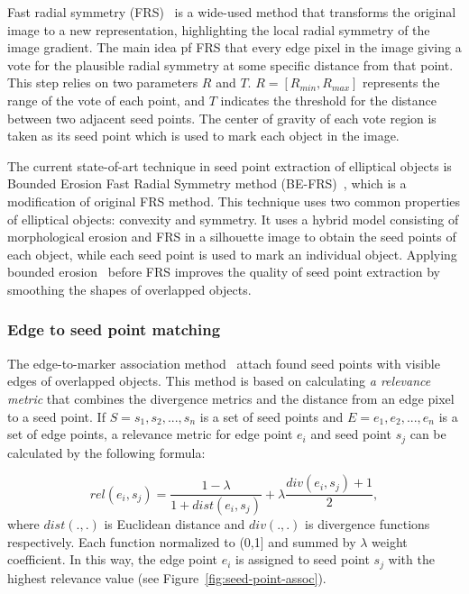 \documentclass{lutmscthesis}[2010/09/22]
\begin{document}
Fast radial symmetry (FRS)~\cite{FRS}  is a wide-used method that transforms the original
image to a new representation, highlighting the local radial symmetry of the image gradient.
The main idea pf FRS that  every edge pixel in the image giving a vote for the plausible radial symmetry at some specific distance from that point. This step relies on two parameters $R$ and $T$. $R = [R_{min} , R_{max}]$ represents the range of the vote of each point, and $T$ indicates the threshold for the distance between two adjacent seed points. The center
of gravity of each vote region is taken as its seed point which is used to mark
each object in the image. 

The current state-of-art technique in seed point extraction of elliptical objects is Bounded Erosion Fast
Radial Symmetry method (BE-FRS)~\cite{BE-FRS}, which is a modification of original FRS method. This technique uses two common properties of elliptical objects: convexity and symmetry.
It uses a hybrid model consisting of morphological erosion and FRS in a
silhouette image to obtain the seed points of each object, while each seed point
is used to mark an individual object. Applying bounded erosion~\cite{BE} before FRS improves the quality of seed point extraction by smoothing the shapes of overlapped objects.

\subsubsection{Edge to seed point matching}

The edge-to-marker association method~\cite{edge-to-seed-point} attach found seed points with visible edges of overlapped objects. This method is based on calculating \textit{a relevance metric} that combines the divergence metrics  and the distance from an edge pixel to a seed point. If $S ={s_1,s_2,...,s_n}$ is a set of seed points and $E ={e_1,e_2,...,e_n}$ is a set of edge points, a relevance metric for edge point $e_i$ and seed point $s_j$ can be calculated by the following formula:

\begin{equation}
    rel(e_i,s_j) = \frac{1-\lambda}{1+dist(e_i,s_j)}+\lambda\frac{div(e_i,s_j)+1}{2},
\end{equation} where $dist(.,.)$ is Euclidean distance and $div(.,.)$ is divergence functions respectively. Each function normalized to (0,1] and summed by $\lambda$ weight coefficient. In this way, the edge
point $e_i$ is assigned to seed point $s_j$ with the highest relevance
value (see Figure~\ref{fig:seed-point-assoc}).
\end{document}
